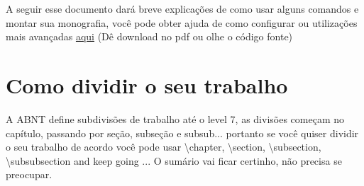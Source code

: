 A seguir esse documento dará breve explicações de como usar alguns comandos e montar sua monografia, você pode obter ajuda de como configurar ou utilizações mais avançadas \href{http://ctan.sharelatex.com/tex-archive/macros/latex/contrib/abntex2/doc/abntex2.pdf}{aqui} (Dê download no pdf ou olhe o código fonte)

\section{Como dividir o seu trabalho}
	A ABNT define subdivisões de trabalho até o level 7, as divisões começam no capítulo, passando por seção, subseção e subsub... portanto se você quiser dividir o seu trabalho de acordo você pode usar \textbackslash chapter, \textbackslash section, \textbackslash subsection, \textbackslash subsubsection and keep going ... O sumário vai ficar certinho, não precisa se preocupar.
